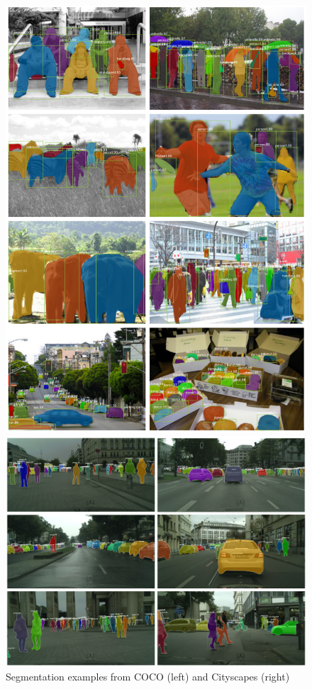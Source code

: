 \begin{figure}[H]
	\centering
	\begin{minipage}{0.35\textwidth}
		\centering
		\includegraphics[width=1\textwidth]{images/cocoexamples.PNG} %
	\end{minipage}\hfill
	\begin{minipage}{0.65\textwidth}
		\centering
		\includegraphics[width=1\textwidth]{images/cityscapes.PNG} %
	\end{minipage}
	\caption{Segmentation examples from COCO (left) and Cityscapes (right)}
	\label{f:maskrcnn-instancecity}
\end{figure}
